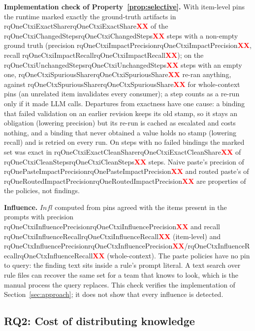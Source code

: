 \documentclass[10pt,conference]{IEEEtran}
\theoremstyle{definition}
\newcommand{\Infl}{\mathit{Infl}}
\newcommand{\R}[1]{\ifcsname #1\endcsname\csname #1\endcsname\else\textcolor{red}{\textbf{XX}}\fi}
\begin{document}
\textbf{Implementation check of Property~\ref{prop:selective}.} With item-level pins the runtime marked exactly
the ground-truth artifacts in \R{rqOneCtxiExactShare} of the \R{rqOneCtxiChangedSteps} steps with a non-empty
ground truth (precision \R{rqOneCtxiImpactPrecision}, recall \R{rqOneCtxiImpactRecall}); on the
\R{rqOneCtxiUnchangedSteps} steps with an empty one, \R{rqOneCtxiSpuriousShare} re-ran anything, against
\R{rqOneCtxSpuriousShare} for whole-context pins (an unrelated item invalidates every consumer); a step
counts as a re-run only if it made LLM calls. Departures from exactness have one cause: a binding that failed
validation on an earlier revision keeps its old stamp, so it stays an obligation (lowering precision) but its
re-run is cached as escalated and costs nothing, and a binding that never obtained a value holds no stamp
(lowering recall) and is retried on every run. On steps with no failed bindings the marked set was exact in
\R{rqOneCtxiExactCleanShare} of \R{rqOneCtxiCleanSteps} steps. Naive paste's precision of \R{rqOnePasteImpactPrecision} and routed paste's of
\R{rqOneRoutedImpactPrecision} are properties of the policies, not findings.

\textbf{Influence.} $\Infl$ computed from pins agreed with the items present in the prompts with precision
\R{rqOneCtxiInfluencePrecision} and recall \R{rqOneCtxiInfluenceRecall} (item-level) and
\R{rqOneCtxInfluencePrecision}/\R{rqOneCtxInfluenceRecall} (whole-context). The paste policies have no
pin to query: the finding text sits inside a rule's prompt literal. A text search over rule files can recover
the same set for a team that knows to look, which is the manual process the query replaces. This check
verifies the implementation of Section~\ref{sec:approach}; it does not show that every influence is detected.

\subsection{RQ2: Cost of distributing knowledge}
\end{document}
